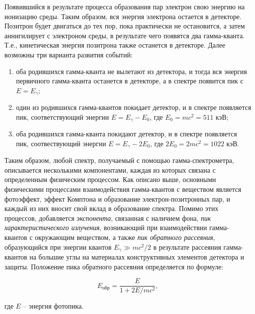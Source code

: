 \documentclass[a4paper,12pt]{article} %
\begin{document}
\medskip

\noindent Появившийся в результате процесса образования пар электрон свою энергию на ионизацию среды. Таким образом, вся энергия электрона остается в детекторе. Позитрон будет двигаться до тех пор, пока практически не остановится, а затем аннигилирует с электроном среды, в результате чего появятся два гамма-кванта. Т.е., кинетическая энергия позитрона также останется в детекторе. Далее возможны три варианта развития событий:

\medskip

\begin{enumerate}
\item оба родившихся гамма-кванта не вылетают из детектора, и тогда вся энергия первичного гамма-кванта останется в детекторе, а в спектре появится пик с $E=E_{\gamma}$;
\item один из родившихся гамма-квантов покидает детектор, и в спектре появляется пик, соответствующий энергии $E=E_{\gamma}-E_0$, где $E_0=mc^2=511$ кэВ;
\item оба родившихся гамма-кванта покидают детектор, и в спектре появляется пик, соотвествующий энергии $E=E_{\gamma}-2E_0$, где $2E_0=2mc^2=1022$ кэВ.
\end{enumerate}

\medskip

\noindent Таким образом, любой спектр, получаемый с помощью гамма-спектрометра, описывается несколькими компонентами, каждая из которых связана с определенным физическим процессом. Как описано выше, основными физическими процессами взаимодействия гамма-квантов с веществом является фотоэффект, эффект Комптона и образование электрон-позитронных пар, и каждый из них вносит свой вклад в образование спектра. Помимо этих процессов, добавляется \textit{экспонента}, связанная с наличием фона, \textit{пик характеристического излучения}, возникающий при взаимодействии гамма-квантов с окружающим веществом, а также \textit{пик обратного рассеяния}, образующийся при энергии квантов $E_{\gamma}\gg mc^2/2$ в результате рассеяния гамма-квантов на большие углы на материалах  конструктивных элементов детектора и защиты. Положение пика обратного рассеяния определяется по формуле:

\medskip

\begin{equation}
E_{\text{обр}}=\frac{E}{1+2E/mc^2},
\label{eq:Ereverse}
\end{equation}

\medskip

\noindent где $E$ -- энергия фотопика.
\end{document}
